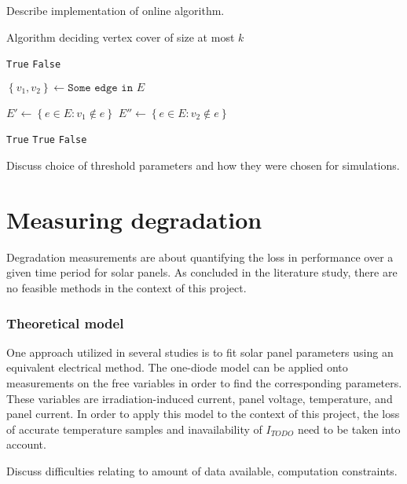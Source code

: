 Describe implementation of online algorithm.

\begin{algorithm}
\begin{algorithmic}
\caption{Algorithm deciding vertex cover of size at most $k$}
\label{fpt-vertex-cover}
    \Return \texttt{True}
    \Return \texttt{False}
\EndIf

\State $\left\{v_1, v_2\right\} \gets \texttt{Some edge in } E$

\State $E'\gets \left\{ e \in E : v_1 \not \in e \right\}$
\State $E''\gets \left\{ e \in E : v_2 \not \in e \right\}$

    \Return \texttt{True}
    \Return \texttt{True}
\Else {}
    \Return \texttt{False}
\EndIf

\EndProcedure
\end{algorithmic}
\end{algorithm}

Discuss choice of threshold parameters and how they were chosen for simulations.

\section{Measuring degradation}
Degradation measurements are about quantifying the loss in performance over a given time period for solar panels.
As concluded in the literature study, there are no feasible methods in the context of this project.

\subsubsection{Theoretical model}
One approach utilized in several studies is to fit solar panel parameters using an equivalent electrical method.
The one-diode model can be applied onto measurements on the free variables in order to find the corresponding parameters.
These variables are irradiation-induced current, panel voltage, temperature, and panel current.
In order to apply this model to the context of this project, the loss of accurate temperature samples and inavailability of
$I_{TODO}$ need to be taken into account.

Discuss difficulties relating to amount of data available, computation constraints.


